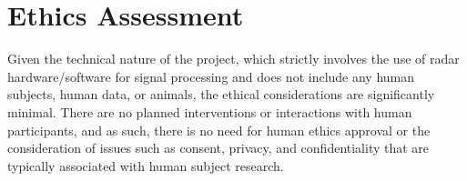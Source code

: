 \documentclass[12pt,a4paper]{article}
\begin{document}
\section{Ethics Assessment}
Given the technical nature of the project, which strictly involves the use of radar hardware/software for signal processing and does not include any human subjects, human data, or animals, the ethical considerations are significantly minimal. There are no planned interventions or interactions with human participants, and as such, there is no need for human ethics approval or the consideration of issues such as consent, privacy, and confidentiality that are typically associated with human subject research.


\newpage
{} %


\end{document}
